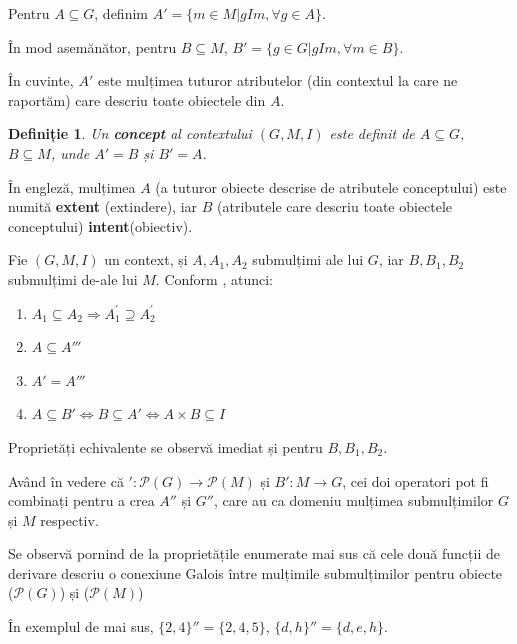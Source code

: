 \documentclass[12pt, a4paper, twoside, romanian]{teza-upb}
\newtheorem{defn}{Definiție}
\begin{document}
    Pentru $A \subseteq G$, definim
    $ A' = \{m \in M | gIm, \forall g \in A\} $.

    În mod asemănător, pentru $B \subseteq M$, $B' = \{g \in G | gIm, \forall m \in B \}$.

    În cuvinte, $A'$ este mulțimea tuturor atributelor (din contextul la care ne raportăm) care descriu toate obiectele din $A$.

    \begin{defn}
      Un \textbf{concept} al contextului $(G, M, I)$ este definit de $A \subseteq G$, $B \subseteq M$, unde $A' = B$ și $B' = A$.
    \end{defn}

    În engleză, mulțimea $A$ (a tuturor obiecte descrise de atributele conceptului) este numită \textbf{extent} (extindere), iar $B$ (atributele care descriu toate obiectele conceptului) \textbf{intent}(obiectiv).


Fie $(G, M, I)$ un context, și $A, A_1, A_2$ submulțimi ale lui $G$, iar $B, B_1, B_2$ submulțimi de-ale lui $M$. Conform \cite{Ganter:1997:FCA:550737}, atunci:

    \begin{enumerate}
        \item $A_1 \subseteq A_2 \Rightarrow A^{'}_{1} \supseteq A^{'}_2$
        \item $A  \subseteq A'''$
        \item $A' = A'''$
        \item $A \subseteq B' \Longleftrightarrow B \subseteq A' \Longleftrightarrow A \times B \subseteq I$
    \end{enumerate}

    Proprietăți echivalente se observă imediat și pentru $B, B_1, B_2$.

    Având în vedere că $ ': \mathcal P \left(G \right) \rightarrow \mathcal P \left(M\right)$ și $B' : M \rightarrow G$, cei doi operatori pot fi combinați pentru a crea $A''$ și $G''$, care au ca domeniu mulțimea submulțimilor $G$ și $M$ respectiv. 

Se observă pornind de la proprietățile enumerate mai sus că cele două funcții de derivare descriu o conexiune Galois între mulțimile submulțimilor pentru obiecte ($\mathcal P \left(G \right)$) și ($\mathcal P \left( M \right) $)

În exemplul de mai sus, $\{2, 4\}'' = \{2, 4, 5\}$, $\{d, h\}'' = \{d, e, h \}$.
\end{document}
